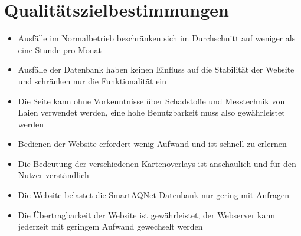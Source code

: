\section{Qualitätszielbestimmungen}
\begin{itemize}
    \item Ausfälle im Normalbetrieb beschränken sich im Durchschnitt auf weniger als eine Stunde pro Monat
    \item Ausfälle der Datenbank haben keinen Einfluss auf die Stabilität der Website und schränken nur die Funktionalität ein
    \item Die Seite kann ohne Vorkenntnisse über Schadstoffe und Messtechnik von Laien verwendet werden, eine hohe Benutzbarkeit muss also gewährleistet werden
    \item Bedienen der Website erfordert wenig Aufwand und ist schnell zu erlernen
    \item Die Bedeutung der verschiedenen Kartenoverlays ist anschaulich und für den Nutzer verständlich
    \item Die Website belastet die SmartAQNet Datenbank nur gering mit Anfragen
    \item Die Übertragbarkeit der Website ist gewährleistet, der Webserver kann jederzeit mit geringem Aufwand gewechselt werden
\end{itemize}